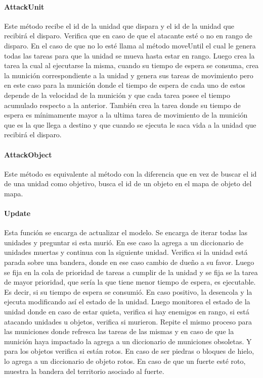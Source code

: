         \paragraph{AttackUnit}
            Este método recibe el id de la unidad que dispara y el id de la unidad
            que recibirá el disparo. Verifica que en caso de que el atacante
            esté o no en rango de disparo. En el caso de que no lo esté llama
            al método moveUntil el cual le genera todas las tareas para que la
            unidad se mueva hasta estar en rango. Luego crea la tarea
             la cual al ejecutarse la misma, cuando su
            tiempo de espera se consuma, crea la munición correspondiente a la
            unidad y genera sus tareas de movimiento pero en este caso para la
            munición donde el tiempo de espera de cada uno de estos depende de
            la velocidad de la munición y que cada tarea posee el tiempo
            acumulado respecto a la anterior. También crea la tarea
             donde su tiempo de espera es mínimamente
            mayor a la ultima tarea de movimiento de la munición que es la que
            llega a destino y que cuando se ejecuta le saca vida a la unidad que
            recibirá el disparo.
        \paragraph{AttackObject}
            Este método es equivalente al método  con la diferencia
            que en vez de buscar el id de una unidad como objetivo, busca el id
            de un objeto en el mapa de objeto del mapa.
        \paragraph{Update}
            Esta función se encarga de actualizar el modelo. Se encarga de iterar
            todas las unidades y preguntar si esta murió. En ese caso la agrega
            a un diccionario de unidades muertas y continua con la siguiente
            unidad. Verifica si la unidad está parada sobre una bandera, donde
            en ese caso cambio de dueño a su favor. Luego se fija en la cola de
            prioridad de tareas a cumplir de la unidad y se fija se la tarea de
            mayor prioridad, que sería la que tiene menor tiempo de espera, es
            ejecutable. Es decir, si su tiempo de espera se consumió. En caso
            positivo, la desencola y la ejecuta modificando así el estado de la
            unidad. Luego monitorea el estado de la unidad donde en caso de estar
            quieta, verifica si hay enemigos en rango, si está atacando unidades
            u objetos, verifica si murieron. Repite el mismo proceso para las
            municiones donde refresca las tareas de las mismas y en caso de que
            la munición haya impactado la agrega a un diccionario de municiones
            obsoletas. Y para los objetos verifica si están rotos. En caso de ser
            piedras o bloques de hielo, lo agrega a un diccionario de objeto
            rotos. En caso de que un fuerte esté roto, muestra la bandera del
            territorio asociado al fuerte.

